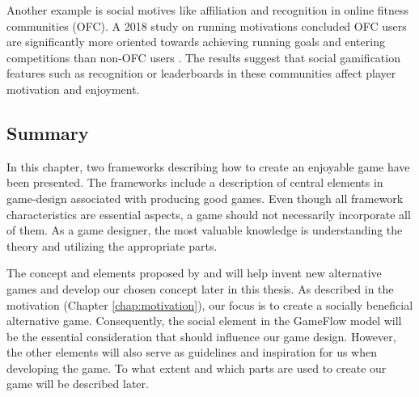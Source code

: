 Another example is social motives like affiliation and recognition in online fitness communities (OFC). A 2018 study on running motivations concluded OFC users are significantly more oriented towards achieving running goals and entering competitions than non-OFC users \citep{stragier_recreational_2018}. The results suggest that social gamification features such as recognition or leaderboards in these communities affect player motivation and enjoyment.

\subsection{Summary}
In this chapter, two frameworks describing how to create an enjoyable game have been presented. The frameworks include a description of central elements in game-design associated with producing good games. Even though all framework characteristics are essential aspects, a game should not necessarily incorporate all of them. As a game designer, the most valuable knowledge is understanding the theory and utilizing the appropriate parts.

The concept and elements proposed by \citeauthor{malone_what_1980} and \citeauthor{sweetser_gameflow_2005} will help invent new alternative games and develop our chosen concept later in this thesis. As described in the motivation (Chapter \ref{chap:motivation}), our focus is to create a socially beneficial alternative game. Consequently, the social element in the GameFlow model will be the essential consideration that should influence our game design. However, the other elements will also serve as guidelines and inspiration for us when developing the game. To what extent and which parts are used to create our game will be described later.
